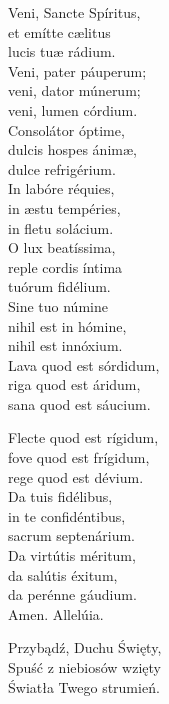 \documentclass[10pt,a5paper]{book}
\newcommand{\oremuss}[2]{
	\begin{sloppypar}
		\begin{paracol}{2}
			\setlength{\columnsep}{0em}
			\begin{leftcolumn}
				#1
			\end{leftcolumn}
			\begin{rightcolumn}
				#2
			\end{rightcolumn}
		\end{paracol}
	\end{sloppypar}}
\begin{document}
				\oremuss{
					Veni, Sancte Spíritus, \\
					et emítte c\ae litus \\
					lucis tuæ rádium.\\
					
					Veni, pater páuperum; \\
					veni, dator múnerum; \\
					veni, lumen córdium.\\
					
					Consolátor óptime, \\
					dulcis hospes ánimæ, \\
					dulce refrigérium.\\
					
					In labóre réquies, \\
					in æstu tempéries, \\
					in fletu solácium.\\
					
					O lux beatíssima, \\
					reple cordis íntima \\
					tuórum fidélium.\\
					
					Sine tuo númine \\
					nihil est in hómine, \\
					nihil est innóxium.\\
					
					Lava quod est sórdidum, \\
					riga quod est áridum, \\
					sana quod est sáucium.
					
					Flecte quod est rígidum, \\
					fove quod est frígidum, \\
					rege quod est dévium.\\
					
					Da tuis fidélibus, \\
					in te confidéntibus, \\
					sacrum septenárium.\\
					
					Da virtútis méritum, \\
					da salútis éxitum, \\
					da perénne gáudium. \\
					Amen. Allelúia.}{
					Przybądź, Duchu Święty,\\
					Spuść z niebiosów wzięty \\
					Światła Twego strumień. \\
					
}
\end{document}
